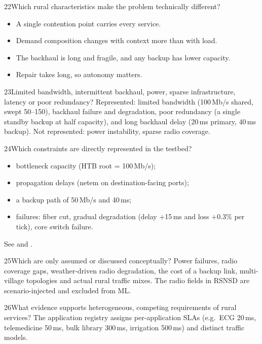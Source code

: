 \begin{qa}{22}{Which rural characteristics make the problem technically different?}
\begin{itemize}
\item A single contention point carries every service.
\item Demand composition changes with context more than with load.
\item The backhaul is long and fragile, and any backup has lower capacity.
\item Repair takes long, so autonomy matters.
\end{itemize}
\end{qa}

\begin{qa}{23}{Limited bandwidth, intermittent backhaul, power, sparse infrastructure, latency or poor redundancy?}
Represented: limited bandwidth (100\,Mb/s shared, swept 50--150), backhaul failure and degradation, poor redundancy
(a single standby backup at half capacity), and long backhaul delay (20\,ms primary, 40\,ms backup).
Not represented: power instability, sparse radio coverage.
\end{qa}

\begin{qa}{24}{Which constraints are directly represented in the testbed?}
\begin{itemize}
\item bottleneck capacity (HTB root = 100\,Mb/s);
\item propagation delays (netem on destination-facing ports);
\item a backup path of 50\,Mb/s and 40\,ms;
\item failures: fiber cut, gradual degradation (delay +15\,ms and loss +0.3\% per tick), core switch failure.
\end{itemize}
See  and .
\end{qa}

\begin{qa}{25}{Which are only assumed or discussed conceptually?}
Power failures, radio coverage gaps, weather-driven radio degradation, the cost of a backup link, multi-village
topologies and actual rural traffic mixes. The radio fields in RSNSD are scenario-injected and excluded from ML.
\end{qa}

\begin{qa}{26}{What evidence supports heterogeneous, competing requirements of rural services?}
The application registry assigns per-application SLAs (e.g.\ ECG 20\,ms, telemedicine 50\,ms, bulk library 300\,ms,
irrigation 500\,ms) and distinct traffic models.
\end{qa}

